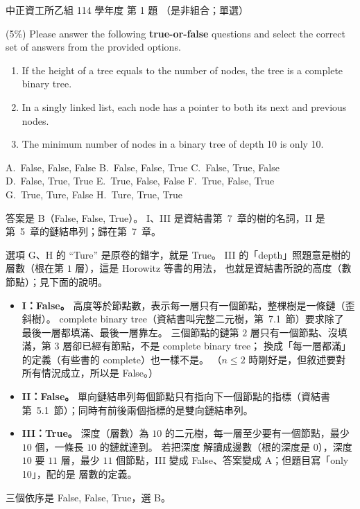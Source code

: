 \begin{pastexam}[label={px:ccu-114-csb-01}]{中正資工所乙組 114 學年度 第 1 題}
（是非組合；單選）

(5\%) Please answer the following \textbf{true-or-false} questions and select the correct set of answers from the provided options.
\begin{enumerate}[label=\Roman*.]
\item If the height of a tree equals to the number of nodes, the tree is a complete binary tree.
\item In a singly linked list, each node has a pointer to both its next and previous nodes.
\item The minimum number of nodes in a binary tree of depth 10 is only 10.
\end{enumerate}

A.~False, False, False \qquad B.~False, False, True \qquad C.~False, True, False\\
D.~False, True, True \qquad E.~True, False, False \qquad F.~True, False, True\\
G.~True, Ture, False \qquad H.~Ture, True, True
\end{pastexam}

\begin{pastsoln}
答案是 B（False, False, True）。 I、III 是資結書第~7~章的樹的名詞，II 是第~5~章的鏈結串列；歸在第~7~章。

選項 G、H 的 ``Ture'' 是原卷的錯字，就是 True。 III 的「depth」照題意是樹的層數（根在第 $1$ 層），這是 Horowitz 等書的用法，
也就是資結書所說的高度（數節點）；見下面的說明。

\begin{itemize}
\item \textbf{I：False。} 高度等於節點數，表示每一層只有一個節點，整棵樹是一條鏈（歪斜樹）。 complete binary tree（資結書叫完整二元樹，第~7.1~節）要求除了
最後一層都填滿、最後一層靠左。 三個節點的鏈第 $2$ 層只有一個節點、沒填滿，第 $3$ 層卻已經有節點，不是 complete binary tree；
換成「每一層都滿」的定義（有些書的 complete）也一樣不是。
（$n \le 2$ 時剛好是，但敘述要對所有情況成立，所以是 False。）
\item \textbf{II：False。} 單向鏈結串列每個節點只有指向下一個節點的指標（資結書第~5.1~節）；同時有前後兩個指標的是雙向鏈結串列。
\item \textbf{III：True。} 深度（層數）為 $10$ 的二元樹，每一層至少要有一個節點，最少 $10$ 個，一條長 $10$ 的鏈就達到。 若把深度
解讀成邊數（根的深度是 $0$），深度 $10$ 要 $11$ 層，最少 $11$ 個節點，III 變成 False、答案變成 A；但題目寫「only 10」，配的是
層數的定義。
\end{itemize}
三個依序是 False, False, True，選 B。
\end{pastsoln}
